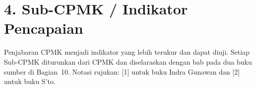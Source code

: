 \documentclass[12pt,a4paper]{article}
\begin{document}
\vspace{0.5cm}

\section*{4. Sub-CPMK / Indikator Pencapaian}

Penjabaran CPMK menjadi indikator yang lebih terukur dan dapat diuji. Setiap Sub-CPMK diturunkan dari CPMK dan diselaraskan dengan bab pada dua buku sumber di Bagian~10. Notasi rujukan: [1] untuk buku Indra Gunawan dan [2] untuk buku S'to.

\vspace{0.2cm}
\end{document}
